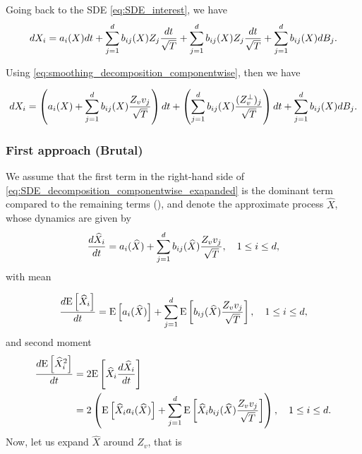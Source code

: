 Going back to the SDE \eqref{eq:SDE_interest}, we have 
\begin{equation}
dX_i=a_i(X) dt+\sum_{j=1}^d b_{ij}(X) Z_j \frac{dt}{\sqrt{T}} +\sum_{j=1}^d b_{ij}(X) Z_j \frac{dt}{\sqrt{T}}+\sum_{j=1}^d b_{ij}(X) dB_j .
\end{equation}

Using \eqref{eq:smoothing_decomposition_componentwise}, then we have

\begin{equation}\label{eq:SDE_decomposition_componentwise_exapanded}
dX_i=\left(a_i(X)+\sum_{j=1}^d b_{ij}(X)  \frac{Z_v v_j}{\sqrt{T}}\right) dt+\left(\sum_{j=1}^d b_{ij}(X) \frac{(Z_v^\perp)_j}{\sqrt{T}}\right) dt +\sum_{j=1}^d b_{ij}(X) dB_j .
\end{equation}

\subsubsection{First approach (Brutal)}

We assume that the first term in the right-hand side of \eqref{eq:SDE_decomposition_componentwise_exapanded}  is the dominant term compared to the remaining terms (), and denote the approximate process $\hat{X}$, whose dynamics are given by
\begin{align}\label{eq:approximate_dynamics}
\frac{d\widehat{X}_i}{dt}=a_i(\widehat{X})+\sum_{j=1}^d b_{ij}(\widehat{X})  \frac{Z_v v_j}{\sqrt{T}}, \quad 1 \le i \le d ,
\end{align}
with mean 

\begin{equation*}
\frac{d\mathrm{E}\left[\widehat{X}_i\right]}{dt}=\mathrm{E}\left[a_i(\widehat{X})\right]+\sum_{j=1}^d \mathrm{E}\left[b_{ij}(\widehat{X})  \frac{Z_v v_j}{\sqrt{T}}\right], \quad 1 \le i \le d ,
\end{equation*}
and second moment
\begin{align*}
\frac{d\mathrm{E}\left[\widehat{X}^2_i\right]}{dt}&=2 \mathrm{E}\left[\widehat{X}_i \frac{d\widehat{X}_i}{dt}\right]\nonumber\\
&=2 \left(\mathrm{E}\left[\widehat{X}_i a_i(\widehat{X})\right]+\sum_{j=1}^d \mathrm{E}\left[ \widehat{X}_i b_{ij}(\widehat{X})  \frac{Z_v v_j}{\sqrt{T}}\right]\right), \quad 1 \le i \le d .
\end{align*}
Now, let us expand $\hat{X}$ around $Z_v$, that is

